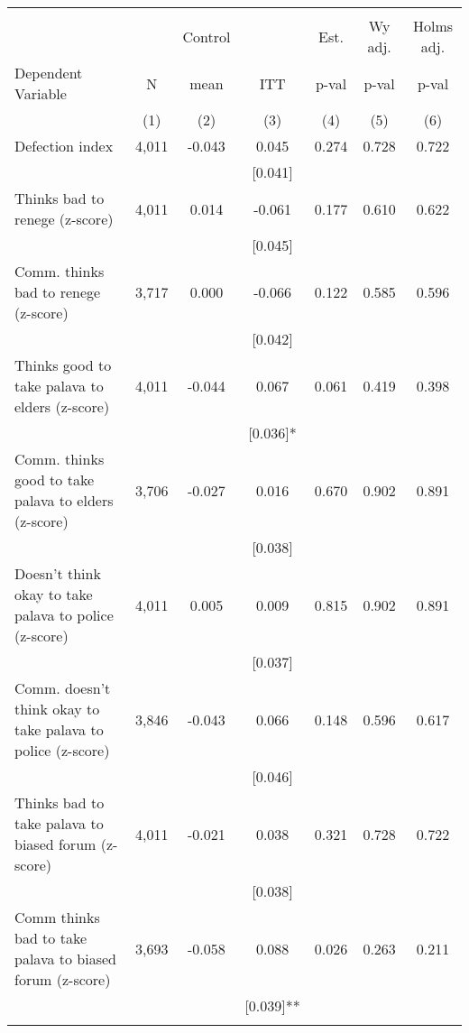 \begin{tabular}{lcccccc}
\hline \noalign{\smallskip} &  &  &  &  &  & \\
 &  & Control &  & Est. & Wy adj. & Holms adj.\\
Dependent Variable & N & mean & ITT & p-val & p-val & p-val\\
 & (1) & (2) & (3) & (4) & (5) & (6)\\
\noalign{\smallskip}\hline \noalign{\smallskip}Defection index & 4,011 & -0.043 & 0.045 & 0.274 & 0.728 & 0.722\\
 &  &  & [0.041] &  &  & \\
\quad Thinks bad to renege (z-score) & 4,011 & 0.014 & -0.061 & 0.177 & 0.610 & 0.622\\
 &  &  & [0.045] &  &  & \\
\quad Comm. thinks bad to renege (z-score) & 3,717 & 0.000 & -0.066 & 0.122 & 0.585 & 0.596\\
 &  &  & [0.042] &  &  & \\
\quad Thinks good to take palava to elders (z-score) & 4,011 & -0.044 & 0.067 & 0.061 & 0.419 & 0.398\\
 &  &  & [0.036]* &  &  & \\
\quad Comm. thinks good to take palava to elders (z-score) & 3,706 & -0.027 & 0.016 & 0.670 & 0.902 & 0.891\\
 &  &  & [0.038] &  &  & \\
\quad Doesn't think okay to take palava to police (z-score) & 4,011 & 0.005 & 0.009 & 0.815 & 0.902 & 0.891\\
 &  &  & [0.037] &  &  & \\
\quad Comm. doesn't think okay to take palava to police (z-score) & 3,846 & -0.043 & 0.066 & 0.148 & 0.596 & 0.617\\
 &  &  & [0.046] &  &  & \\
\quad Thinks bad to take palava to biased forum (z-score) & 4,011 & -0.021 & 0.038 & 0.321 & 0.728 & 0.722\\
 &  &  & [0.038] &  &  & \\
\quad Comm thinks bad to take palava to biased forum (z-score) & 3,693 & -0.058 & 0.088 & 0.026 & 0.263 & 0.211\\
 &  &  & [0.039]** &  &  & \\
\noalign{\smallskip}\hline\end{tabular}
